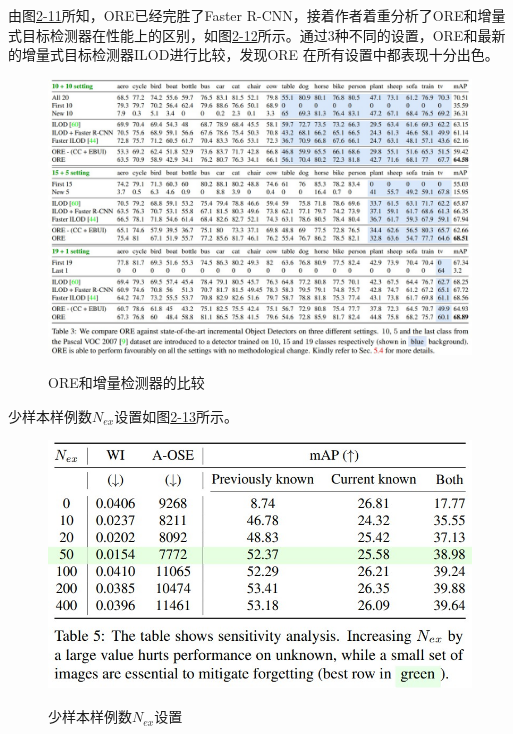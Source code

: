 由图\href{fig:2-11}{2-11}所知，ORE已经完胜了Faster R-CNN，接着作者着重分析了ORE和增量式目标检测器在性能上的区别，如图\href{fig:2-12}{2-12}所示。通过3种不同的设置，ORE和最新的增量式目标检测器ILOD进行比较，发现ORE 在所有设置中都表现十分出色。
\begin{figure}
  \centering
  \includegraphics[width=6in]{figure/example/ORE7.jpg}\\
  \caption{ORE和增量检测器的比较}
  \label{}
\end{figure}

少样本样例数$N_{ex}$设置如图\href{fig:2-13}{2-13}所示。
\begin{figure}
  \centering
  \includegraphics[width=4.5in]{figure/example/ORE9.jpg}\\
  \caption{少样本样例数$N_{ex}$设置}
  \label{}
\end{figure}

